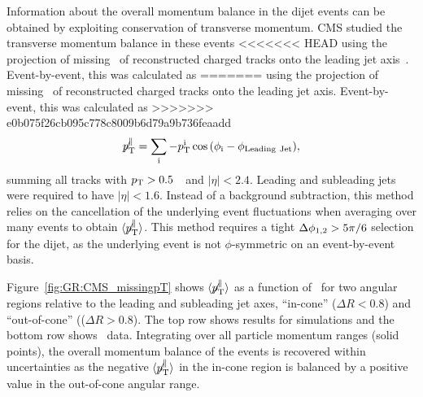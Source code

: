 Information about the overall momentum balance in the dijet events can be obtained by exploiting
conservation of transverse momentum. CMS studied the transverse momentum balance in these events
<<<<<<< HEAD
using the projection of missing \pT\ of reconstructed charged tracks onto the leading 
jet axis~\cite{Chatrchyan:2011sx}. 
Event-by-event, this was calculated as 
=======
using the projection of missing \pT\ of reconstructed charged tracks onto the leading jet axis.
Event-by-event, this was calculated as
>>>>>>> e0b075f26cb095c778c8009b6d79a9b736feaadd
\begin{equation}
\displaystyle{\not} p_{\mathrm{T}}^{\parallel} =
\sum_{\rm i}{ -p_{\mathrm{T}}^{\rm i}\cos{(\phi_{\rm i}-\phi_{\rm Leading\ Jet})}},
\end{equation}
summing all tracks with $\mbox{$p_{\mathrm{T}}$} > 0.5$~\GeVc\ and $|\eta| < 2.4$.
Leading and subleading jets were required to have $|\eta| < 1.6$.
Instead of a background subtraction, this method relies on the cancellation of the
underlying event fluctuations when averaging over many events to obtain
$\langle \displaystyle{\not} p_{\mathrm{T}}^{\parallel} \rangle$.
This method requires a tight $\Delta\phi_{1,2} > 5 \pi/6$ selection for the dijet, as the underlying
event is not $\phi$-symmetric on an event-by-event basis.

Figure~\ref{fig:GR:CMS_missingpT} shows $\langle \displaystyle{\not} p_{\mathrm{T}}^{\parallel} \rangle$
as a function of \AJ\ for two angular regions relative to the leading and subleading
jet axes, ``in-cone'' ($\Delta R < 0.8$) and ``out-of-cone'' (($\Delta R > 0.8$).
The top row shows results for  {} simulations and the bottom row shows
\PbPb\ data. Integrating over all particle momentum ranges (solid points),
 the overall momentum balance of the events is recovered within uncertainties
as the negative $\langle \displaystyle{\not} p_{\mathrm{T}}^{\parallel} \rangle$ in
the in-cone region is balanced by a positive value in the out-of-cone angular range.

